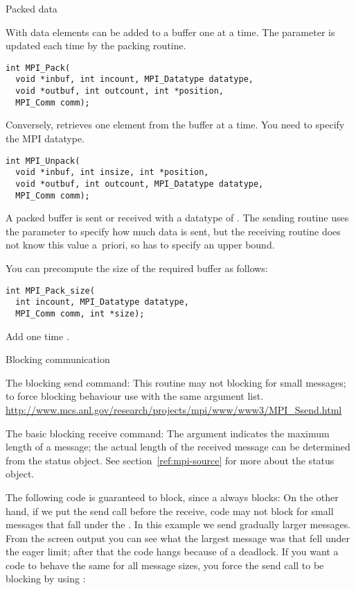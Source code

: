  {Packed data}

With  data elements can be added 
to a buffer one at a time. The  parameter is updated
each time by the packing routine.
\begin{verbatim}
int MPI_Pack(
  void *inbuf, int incount, MPI_Datatype datatype,
  void *outbuf, int outcount, int *position,
  MPI_Comm comm);
\end{verbatim}

Conversely,  retrieves one element
from the buffer at a time. You need to specify the MPI datatype.
\begin{verbatim}
int MPI_Unpack(
  void *inbuf, int insize, int *position,
  void *outbuf, int outcount, MPI_Datatype datatype,
  MPI_Comm comm);
\end{verbatim}

A packed buffer is sent or received with a datatype of
. The sending routine uses the 
parameter to specify how much data is sent, but the receiving routine
does not know this value a~priori, so has to specify an upper bound.


You can precompute the size of the required buffer as follows:
\begin{verbatim}
int MPI_Pack_size(
  int incount, MPI_Datatype datatype,
  MPI_Comm comm, int *size);
\end{verbatim}
Add one time .

 {Blocking communication}

The blocking send command:
%
%
This routine may not blocking for small messages; to force blocking
behaviour use  with the same argument list.
\url{http://www.mcs.anl.gov/research/projects/mpi/www/www3/MPI_Ssend.html}

The basic blocking receive command:
%
%
The  argument indicates the maximum length of a message; the
actual length of the received message can be determined 
from the status object. See section~\ref{ref:mpi-source}
for more about the status object.

The following code is guaranteed to block, since a 
always blocks:
On the other hand, if we put the send call before the receive,
code may not block for small messages
that fall under the . In this example we send
gradually larger messages. From the screen output you can see what
the largest message was that fell under the eager limit; after that the code
hangs because of a deadlock.
%
%
%
If you want a code to behave the same for all message sizes,
you force the send call to be blocking by using :


